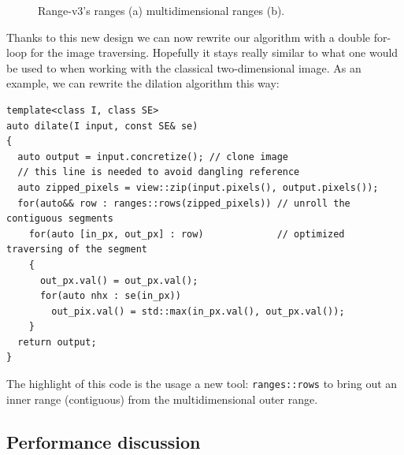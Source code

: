 \begin{figure}[htbp]
  \centering
  \caption{Range-v3's ranges (a) \vs multidimensional ranges (b).}
  \label{fig.inner.outer.range}
\end{figure}

Thanks to this new design we can now rewrite our algorithm with a double for-loop for the image traversing. Hopefully it
stays really similar to what one would be used to when working with the classical two-dimensional image. As an example,
we can rewrite the dilation algorithm this way:
\begin{verbatim}
template<class I, class SE>
auto dilate(I input, const SE& se)
{
  auto output = input.concretize(); // clone image
  // this line is needed to avoid dangling reference
  auto zipped_pixels = view::zip(input.pixels(), output.pixels());
  for(auto&& row : ranges::rows(zipped_pixels)) // unroll the contiguous segments
    for(auto [in_px, out_px] : row)             // optimized traversing of the segment
    {
      out_px.val() = out_px.val();
      for(auto nhx : se(in_px))
        out_pix.val() = std::max(in_px.val(), out_px.val());
    }
  return output;
}
\end{verbatim}

The highlight of this code is the usage a new tool: \texttt{ranges::rows} to bring out an inner range (contiguous) from
the multidimensional outer range.

\subsection{Performance discussion}

